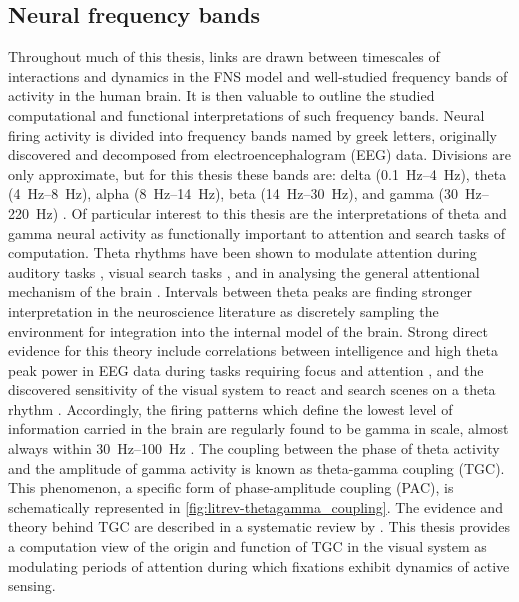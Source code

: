 \subsection{Neural frequency bands}\label{subsec:neur_freq_bands}
Throughout much of this thesis, links are drawn between timescales of interactions and dynamics in the FNS model and well-studied frequency bands of activity in the human brain. It is then valuable to outline the studied computational and functional interpretations of such frequency bands. Neural firing activity is divided into frequency bands named by greek letters, originally discovered and decomposed from electroencephalogram (EEG) data. Divisions are only approximate, but for this thesis these bands are: delta (\SIrange{0.1}{4}{\hertz}), theta (\SIrange{4}{8}{\hertz}), alpha (\SIrange{8}{14}{\hertz}), beta (\SIrange{14}{30}{\hertz}), and gamma (\SIrange{30}{220}{\hertz}) \cite{fan_relation_2007, klimesch_frequency_2018}. Of particular interest to this thesis are the interpretations of theta and gamma neural activity as functionally important to attention and search tasks of computation. Theta rhythms have been shown to modulate attention during auditory tasks \cite{wang_attention_2022, yang_neural_2024}, visual search tasks \cite{kawashima_attentional_2022, spyropoulos_theta_2018, Mo_competing_2019}, and in analysing the general attentional mechanism of the brain \cite{tan_theta_2024, fan_relation_2007, klimesch_frequency_2018}. Intervals between theta peaks are finding stronger interpretation in the neuroscience literature as discretely sampling the environment for integration into the internal model of the brain. Strong direct evidence for this theory include correlations between intelligence and high theta peak power in EEG data during tasks requiring focus and attention \cite{wang_attention_2022, tan_theta_2024}, and the discovered sensitivity of the visual system to react and search scenes on a theta rhythm \cite{kawashima_attentional_2022, spyropoulos_theta_2018}. Accordingly, the firing patterns which define the lowest level of information carried in the brain are regularly found to be gamma in scale, almost always within \SIrange{30}{100}{\hertz} \cite{canolty_high_2006, harris2026-cn, ursino_thetagamma_2024, brooks_thetagamma_2020, tort_thetagamma_2009}. The coupling between the phase of theta activity and the amplitude of gamma activity is known as theta-gamma coupling (TGC). This phenomenon, a specific form of phase-amplitude coupling (PAC), is schematically represented in \cref{fig:litrev-thetagamma_coupling}. The evidence and theory behind TGC are described in a systematic review by \textcite{ursino_thetagamma_2024}. This thesis provides a computation view of the origin and function of TGC in the visual system as modulating periods of attention during which fixations exhibit dynamics of active sensing. 
